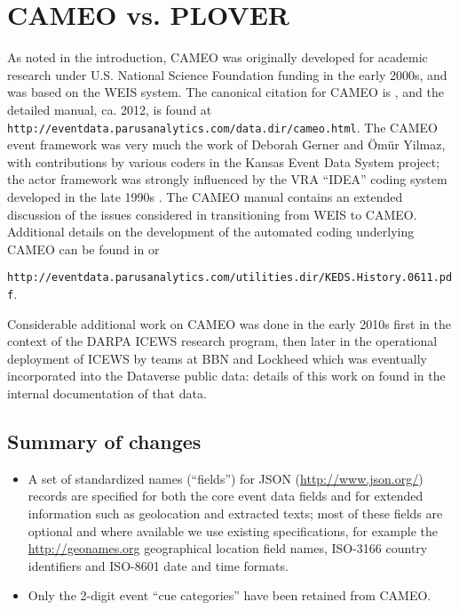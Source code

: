 \documentclass[11pt]{report}
\begin{document}

\chapter{CAMEO vs. PLOVER}

As noted in the introduction, CAMEO was originally developed for academic research under U.S. National Science Foundation funding in the early 2000s, and was based on the WEIS system. The canonical citation for CAMEO is \cite{SGY09}, and the detailed manual, ca. 2012, is found at \texttt{\footnotesize http://eventdata.parusanalytics.com/data.dir/cameo.html}.  The CAMEO event framework was very much the work of Deborah Gerner and \"Om\"ur Yilmaz, with contributions by various coders in the Kansas Event Data System project; the actor framework was strongly influenced by the VRA ``IDEA'' coding system developed in the late 1990s \citep{BBOJT03}. The CAMEO manual contains an extended discussion of the issues considered in transitioning from WEIS to CAMEO. Additional details on the development of the automated coding underlying CAMEO can be found in \cite{Schrodt06TPM} or {\texttt{\footnotesize http://eventdata.parusanalytics.com/utilities.dir/KEDS.History.0611.pdf}.  

Considerable additional work on CAMEO was done in the early 2010s first in the context of the DARPA ICEWS research program, then later in the operational deployment of ICEWS by teams at BBN and Lockheed which was eventually incorporated into the Dataverse public data: details of this work on found in the internal documentation of that data.

\section{Summary of changes}

\begin{itemize}

\item A set of standardized names (``fields'') for JSON (\url{http://www.json.org/}) records are specified for both the core event data fields and for extended information such as geolocation and extracted texts; most of these fields are optional and where available we use existing specifications, for example the \url{http://geonames.org} geographical location field names, ISO-3166 country identifiers and ISO-8601 date and time formats.

\item Only the 2-digit event ``cue categories'' have been retained from CAMEO.


\end{itemize}}
\end{document}
